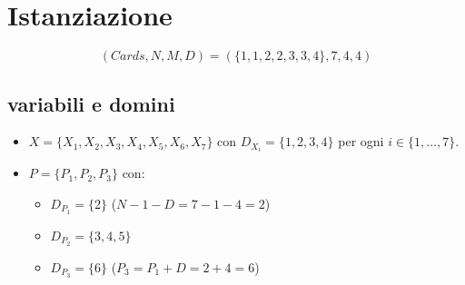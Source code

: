 \documentclass[12pt]{article}
\begin{document}
\section{Istanziazione}
$$(Cards, N, M, D) = (\{1, 1, 2, 2, 3, 3, 4\}, 7, 4, 4)$$

\subsection*{variabili e domini}
\begin{itemize}
    \item $X = \{X_1, X_2, X_3, X_4, X_5, X_6, X_7\}$ con $D_{X_i} = \{1, 2, 3, 4\}$ per ogni $i \in \{1, \dots, 7\}$.
    \item $P = \{P_1, P_2, P_3\}$ con:
    \begin{itemize}
        \item $D_{P_1} = \{2\}$ ($N - 1 - D = 7 - 1 - 4 = 2$)
        \item $D_{P_2} = \{3, 4, 5\}$
        \item $D_{P_3} = \{6\}$ ($P_3 = P_1 + D = 2 + 4 = 6$)
    \end{itemize}
\end{itemize}
\end{document}
